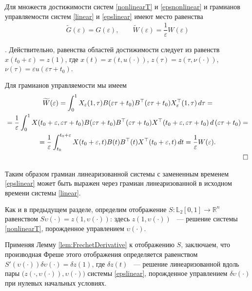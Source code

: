 \documentclass[../main.tex]{subfiles}
\begin{document}
\begin{utv}\label{utv}
	{\textit Для множеств достижимости систем \eqref{nonlinearT} и \eqref{epsnonlinear} и грамианов управляемости систем \eqref{linear} и \eqref{epslinear} имеют место равенства}
	\begin{gather*}
		\widetilde{G}(\varepsilon)=G(\varepsilon),  \qquad
		\widetilde{W}(\varepsilon) = \dfrac{1}{\varepsilon} W(\varepsilon)
	\end{gather*}
\end{utv}

\doc. 
Действительно, равенства областей достижимости следует из равенств $ x(t_0 + \varepsilon) = z(1) $, где $ x(t) = x(t,u(\cdot)) $, $ z(\tau) = z(\tau,\nu(\cdot))  $, $ \nu(\tau) = \varepsilon u(\varepsilon \tau + t_0)  $.

Для грамианов управляемости мы имеем
\begin{gather*}
	\begin{gathered}
		\widetilde{W}(\varepsilon) =
		\int_0^1
		X_{ \varepsilon} (1,\tau)
		B(\varepsilon \tau + t_0)
		B^{\top}(\varepsilon \tau + t_0)
		X_{ \varepsilon}^{\top} (1,\tau) \, d\tau = \\
		= \dfrac{1}{\varepsilon}\int_0^1
		X(t_0+\varepsilon,\varepsilon \tau + t_0)
		B(\varepsilon \tau + t_0)
		B^{\top}(\varepsilon \tau + t_0)
		X^{\top}(t_0+\varepsilon,\varepsilon \tau + t_0) \,
		d\left( \varepsilon\tau + t_0\right) = \\ =
		\dfrac{1}{\varepsilon} \int_{t_0}^{t_0+\varepsilon}
		X(t_0+\varepsilon,t)
		B(t)
		B^{\top}(t)
		X^{\top}(t_0+\varepsilon,t) \, dt = \dfrac{1}{\varepsilon} W(\varepsilon). \\ \hfill \square
	\end{gathered}
\end{gather*}


Таким образом грамиан линеаризованной системы с замененным временем \eqref{epslinear} может быть выражен через грамиан линеаризованной в исходном времени системы \eqref{linear}.
    
    
 Как и в предыдущем разделе, определим отображение $S: \mathbb{L}_2[0,1] \rightarrow \mathbb{R}^n $ равенством $S\upsilon(\cdot) = z(1,\upsilon(\cdot))$: здесь $ z(1,\upsilon(\cdot))$ ~--- решение системы \eqref{nonlinearT}, порожденное управлением $\upsilon(\cdot)$. 
 
 Применяя Лемму \ref{lem:FrechetDerivative} к отображению $S$, заключаем, что производная Фреше этого отображения определяется равенством $ S'(\upsilon(\cdot))\delta \upsilon(\cdot) = \delta z(1)$, где $\delta z(t)$ ~--- решение линеаризованной вдоль пары $\big( z(\cdot,\upsilon(\cdot)),\upsilon(\cdot)\big)  $ системы \eqref{epslinear}, порожденное управлением $\delta \upsilon(\cdot)$ при нулевых начальных условиях.
 
\end{document}
